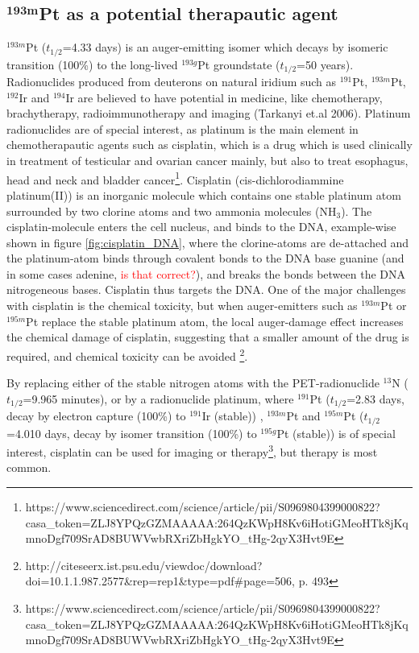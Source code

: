 \documentclass[a4paper,11pt,twoside]{book}
\begin{document}
\subsection{$\mathbf{^{193m}}$Pt as a potential therapautic agent}
$^{193m}$Pt ($t_{1/2}$=4.33 days) is an auger-emitting isomer which decays by isomeric transition (100\%) to the long-lived $^{193g}$Pt groundstate ($t_{1/2}$=50 years). Radionuclides produced from deuterons on natural iridium such as $^{191}$Pt, $^{193m}$Pt, $^{192}$Ir and $^{194}$Ir are believed to have potential in medicine, like chemotherapy, brachytherapy, radioimmunotherapy and imaging (Tarkanyi et.al 2006). Platinum radionuclides are of special interest, as platinum is the main element in chemotherapautic agents such as cisplatin, which is a drug which is used clinically in treatment of testicular and ovarian cancer mainly, but also to treat esophagus, head and neck and bladder cancer\footnote{https://www.sciencedirect.com/science/article/pii/S0969804399000822?casa_token=ZLJ8YPQzGZMAAAAA:264QzKWpH8Kv6iHotiGMeoHTk8jKqmnoDgf709SrAD8BUWVwbRXriZbHgkYO_tHg-2qyX3Hvt9E}. Cisplatin  (cis-dichlorodiammine platinum(II)) is an inorganic molecule which contains one stable platinum atom surrounded by two clorine atoms and two ammonia molecules (NH$_3$). The cisplatin-molecule enters the cell nucleus, and binds to the DNA, example-wise shown in figure \ref{fig:cisplatin_DNA}, where the clorine-atoms are de-attached and the platinum-atom binds through covalent bonds to the DNA base guanine (and in some cases adenine, \textcolor{red}{is that correct?}), and breaks the bonds between the DNA nitrogeneous bases. Cisplatin thus targets the DNA. One of the major challenges with cisplatin is the chemical toxicity, but when auger-emitters such as $^{193m}$Pt or $^{195m}$Pt replace the stable platinum atom, the local auger-damage effect increases the chemical damage of cisplatin, suggesting that a smaller amount of the drug is required, and chemical toxicity can be avoided \footnote{http://citeseerx.ist.psu.edu/viewdoc/download?doi=10.1.1.987.2577&rep=rep1&type=pdf#page=506, p. 493}. 

By replacing either of the stable nitrogen atoms with the PET-radionuclide $^{13}$N ($t_{1/2}$=9.965 minutes), or by a radionuclide platinum, where $^{191}$Pt ($t_{1/2}$=2.83 days, decay by electron capture (100\%) to $^{191}$Ir (stable)) , $^{193m}$Pt and $^{195m}$Pt ($t_{1/2}$=4.010 days, decay by isomer transition (100\%) to $^{195g}$Pt (stable)) is of special interest, cisplatin can be used for imaging or therapy\footnote{https://www.sciencedirect.com/science/article/pii/S0969804399000822?casa_token=ZLJ8YPQzGZMAAAAA:264QzKWpH8Kv6iHotiGMeoHTk8jKqmnoDgf709SrAD8BUWVwbRXriZbHgkYO_tHg-2qyX3Hvt9E}, but therapy is most common. \\ 
\end{document}

